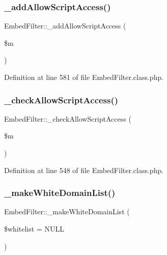 \subsubsection{\texorpdfstring{\+\_\+add\+Allow\+Script\+Access()}{\_addAllowScriptAccess()}}
{\footnotesize\ttfamily Embed\+Filter\+::\+\_\+add\+Allow\+Script\+Access (\begin{DoxyParamCaption}\item[{}]{\$m }\end{DoxyParamCaption})}



Definition at line 581 of file Embed\+Filter.\+class.\+php.

\mbox{\label{classEmbedFilter_a75054db2fbd30ab9392bbccf8dec3885}} 
\subsubsection{\texorpdfstring{\+\_\+check\+Allow\+Script\+Access()}{\_checkAllowScriptAccess()}}
{\footnotesize\ttfamily Embed\+Filter\+::\+\_\+check\+Allow\+Script\+Access (\begin{DoxyParamCaption}\item[{}]{\$m }\end{DoxyParamCaption})}



Definition at line 548 of file Embed\+Filter.\+class.\+php.

\mbox{\label{classEmbedFilter_a9957ded7133614407948d1b2bc43a771}} 
\subsubsection{\texorpdfstring{\+\_\+make\+White\+Domain\+List()}{\_makeWhiteDomainList()}}
{\footnotesize\ttfamily Embed\+Filter\+::\+\_\+make\+White\+Domain\+List (\begin{DoxyParamCaption}\item[{}]{\$whitelist = {\ttfamily NULL} }\end{DoxyParamCaption})}


